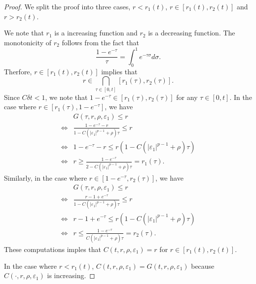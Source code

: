 \documentclass[reqno]{amsart}
\begin{document}
\begin{proof}
We split the proof into three cases,
$r < r_1(t)$, $r \in [r_1(t), r_2(t)]$ and $r > r_2(t)$.

We note that $r_1$ is a increasing function and $r_2$ is a decreasing function.
The monotonicity of $r_2$ follows from the fact that
	\[
	\frac{1-e^{-\tau}}{\tau}
	= \int_0^1 e^{-\tau \sigma} d \sigma.
	\]
Therfore, $r \in [r_1(t), r_2(t)]$ implies that
	\[
	r \in \bigcap_{\tau \in [0,t]} [r_1(\tau), r_2(\tau)].
	\]
Since $C \delta t < 1$, we note that $1-e^{-\tau} \in [r_1(\tau), r_2(\tau)]$ for any $\tau \in [0,t]$.
In the case where $r \in [r_1(\tau), 1-e^{-\tau}]$, we have
	\begin{align*}
	&G(\tau,r,\rho, \varepsilon_1) \leq r\\
	\Leftrightarrow & \frac{ 1 - e^{-\tau} - r}{1-C ( |\varepsilon_1|^{p-1} + \rho ) \tau} \leq r\\
	\Leftrightarrow & 1 - e^{-\tau} - r \leq r (1-C ( |\varepsilon_1|^{p-1} + \rho ) \tau)\\
	\Leftrightarrow & r \geq \frac{1-e^{-\tau}}{2-C ( |\varepsilon_1|^{p-1} + \rho ) \tau} = r_1(\tau).
	\end{align*}
Similarly, in the case where $r \in [1-e^{-\tau}, r_2(\tau)]$, we have
	\begin{align*}
	&G(\tau,r,\rho, \varepsilon_1) \leq r\\
	\Leftrightarrow & \frac{ r - 1 + e^{-\tau}}{1-C ( |\varepsilon_1|^{p-1} + \rho ) \tau} \leq r\\
	\Leftrightarrow & r - 1 + e^{-\tau} \leq r (1-C ( |\varepsilon_1|^{p-1} + \rho ) \tau)\\
	\Leftrightarrow & r \leq \frac{1-e^{-\tau}}{C ( |\varepsilon_1|^{p-1} + \rho ) \tau} = r_2(\tau).
	\end{align*}
These computations imples that $C(t,r,\rho, \varepsilon_1) = r$ for $r \in [r_1(t), r_2(t)]$.

In the case where $r < r_1(t)$,
$C(t,r,\rho, \varepsilon_1) = G(t,r,\rho, \varepsilon_1)$ because $C(\cdot,r,\rho, \varepsilon_1)$ is increasing.


\end{proof}
\end{document}
